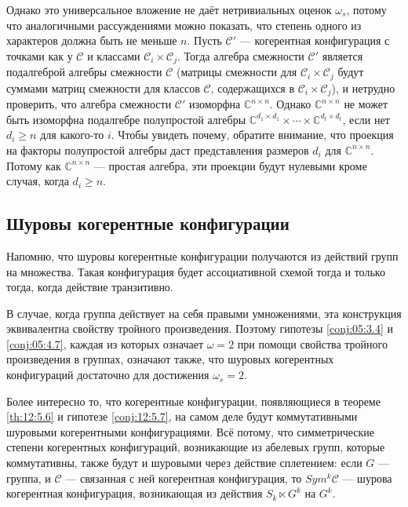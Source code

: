 Однако это универсальное вложение не даёт нетривиальных оценок $\omega_s$, потому что аналогичными рассуждениями можно показать, что степень одного из характеров должна быть не меньше $n$. Пусть $\mathscr{C}'$ --- когерентная конфигурация с точками как у $\mathscr{C}$ и классами $\mathscr{C}_i \times \mathscr{C}_j$. Тогда алгебра смежности $\mathscr{C}'$ является подалгеброй алгебры смежности $\mathscr{C}$ (матрицы смежности для $\mathscr{C}_i \times \mathscr{C}_j$ будут суммами матриц смежности для классов $\mathscr{C}$, содержащихся в $\mathscr{C}_i \times \mathscr{C}_j$), и нетрудно проверить, что алгебра смежности $\mathscr{C}'$ изоморфна $\mathbb{C}^{n \times n}$. Однако $\mathbb{C}^{n \times n}$ не может быть изоморфна подалгебре полупростой алгебры $\mathbb{C}^{d_1 \times d_1} \times \dotsm \times \mathbb{C}^{d_t \times d_t}$, если нет $d_i \geq n$ для какого-то $i$. Чтобы увидеть почему, обратите внимание, что проекция на факторы полупростой алгебры даст представления размеров $d_i$ для $\mathbb{C}^{n \times n}$. Потому как $\mathbb{C}^{n \times n}$ --- простая алгебра, эти проекции будут нулевыми кроме случая, когда $d_i \geq n$. 

\subsection{Шуровы когерентные конфигурации}

Напомню, что шуровы когерентные конфигурации получаются из действий групп на множества. Такая конфигурация будет ассоциативной схемой тогда и только тогда, когда действие транзитивно.

В случае, когда группа действует на себя правыми умножениями, эта конструкция эквивалентна свойству тройного произведения. Поэтому гипотезы \ref{conj:05:3.4} и \ref{conj:05:4.7}, каждая из которых означает $\omega=2$ при помощи свойства тройного произведения в группах, означают также, что шуровых когерентных конфигураций достаточно для достижения $\omega_s=2$.

Более интересно то, что когерентные конфигурации, появляющиеся в теореме \ref{th:12:5.6} и гипотезе \ref{conj:12:5.7}, на самом деле будут коммутативными шуровыми когерентными конфигурациями. Всё потому, что симметрические степени когерентных конфигураций, возникающие из абелевых групп, которые коммутативны, также будут и шуровыми через действие сплетением: если $G$ --- группа, и $\mathscr{C}$ --- связанная с ней когерентная конфигурация, то $Sym^k \mathscr{C}$ --- шурова когерентная конфигурация, возникающая из действия $S_k \ltimes G^k$ на $G^k$.

